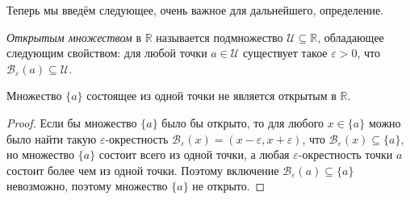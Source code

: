 Теперь мы введём следующее, очень важное для дальнейшего, определение.

\begin{definition}\label{open_in_R}
\textit{Открытым множеством} в $\mathbb{R}$ называется подмножество $\mathscr{U} \subseteq \mathbb{R}$, обладающее следующим свойством: для любой точки $a \in \mathscr{U}$ существует такое $\varepsilon >0$, что $\mathscr{B}_\varepsilon(a) \subseteq \mathscr{U}$.
\end{definition}

\begin{lemma}\label{point_is_not_open}
    Множество $\{a\}$ состоящее из одной точки не является открытым в $\mathbb{R}$. 
\end{lemma}

\begin{proof}
   Если бы множество $\{a\}$ было бы открыто, то для любого $x\in \{a\}$ можно было найти такую $\varepsilon$-окрестность $\mathscr{B}_\varepsilon(x)=(x-\varepsilon, x+\varepsilon)$, что $\mathscr{B}_\varepsilon(x) \subseteq \{a\}$, но множество $\{a\}$ состоит всего из одной точки, а любая $\varepsilon$-окрестность точки $a$ состоит более чем из одной точки. Поэтому включение $\mathscr{B}_\varepsilon(a) \subseteq \{a\}$ невозможно, поэтому множество $\{a\}$ не открыто.
\end{proof}

